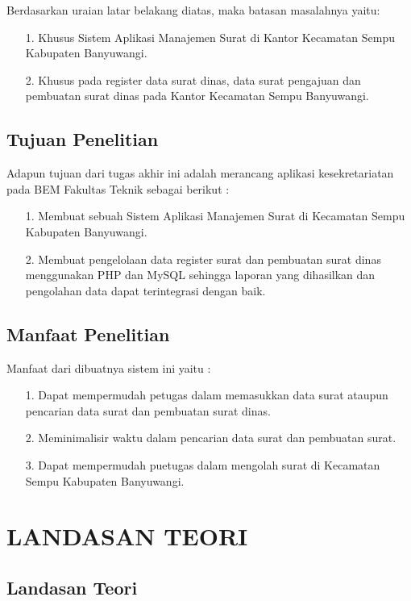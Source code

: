 \documentclass{jtetiproposalskripsi}
\begin{document}
Berdasarkan uraian latar belakang diatas, maka batasan masalahnya yaitu:
\begin{itemize}
\item[1.] Khusus Sistem Aplikasi Manajemen Surat di Kantor Kecamatan Sempu Kabupaten Banyuwangi.
\item[2.] Khusus pada register data surat dinas, data surat pengajuan dan pembuatan surat dinas pada Kantor Kecamatan Sempu Banyuwangi.
\end{itemize}

\section{Tujuan Penelitian}
Adapun tujuan dari tugas akhir ini adalah merancang aplikasi kesekretariatan pada BEM Fakultas Teknik sebagai berikut :
\begin{itemize}
\item[1.] Membuat sebuah Sistem Aplikasi Manajemen Surat di Kecamatan Sempu Kabupaten Banyuwangi.
\item[2.] Membuat pengelolaan data register surat  dan pembuatan surat dinas menggunakan PHP dan MySQL sehingga laporan yang dihasilkan dan pengolahan data dapat terintegrasi dengan baik.
\end{itemize}


\section{Manfaat Penelitian}
Manfaat dari dibuatnya sistem ini yaitu :
\begin{itemize}
\item[1.] Dapat mempermudah petugas dalam memasukkan data surat ataupun pencarian data surat dan pembuatan surat dinas.
\item[2.] Meminimalisir waktu dalam pencarian data surat dan pembuatan surat.
\item[3.] Dapat mempermudah puetugas dalam mengolah surat di Kecamatan Sempu Kabupaten Banyuwangi.
\end{itemize}

\chapter{LANDASAN TEORI}               
\section{Landasan Teori}
\end{document}
